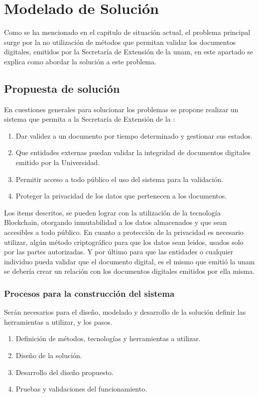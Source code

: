 \chapter{Modelado de Solución}
Como se ha mencionado en el capitulo de situación actual, el problema principal surge por la no utilización
de métodos que permitan validar los documentos digitales, emitidos por la Secretaría de Extensión de la \gls{unam}, 
en este apartado se explica como abordar la solución a este problema.

\section{Propuesta de solución}

En cuestiones generales para solucionar los problemas se propone realizar un sistema que permita a la 
Secretaría de Extensión de la  :

\begin{enumerate}
    \item Dar validez a un documento por tiempo determinado y gestionar sus estados.
    \item Que entidades externas puedan validar la integridad de documentos digitales emitido por la Universidad.
    \item Permitir acceso a todo público el uso del sistema para la validación.
    \item Proteger la privacidad de los datos que pertenecen a los documentos.
\end{enumerate}

Los items descritos, se pueden lograr con la utilización de la tecnología Blockchain, 
otorgando inmutabilidad a los datos almacenados y que sean accesibles a todo público.
En cuanto a protección de la privacidad es necesario utilizar, algún método criptográfico 
para que los datos sean leidos, usados solo por las partes autorizadas.
Y por último para que las entidades o cualquier individuo pueda validar que el documento digital, es el mismo
que emitió la \gls{unam} se debería crear un relación con los documentos digitales emitidos por ella misma. 

\subsection{Procesos para la construcción del sistema}
Serán necesarios para el diseño, modelado y desarrollo de la solución definir las herramientas a utilizar,
y los pasos.
\begin{enumerate}
    \item Definición de métodos, tecnologías y herramientas a utilizar.
    \item Diseño de la solución.
    \item Desarrollo del diseño propuesto.
    \item Pruebas y validaciones del funcionamiento.
\end{enumerate}


